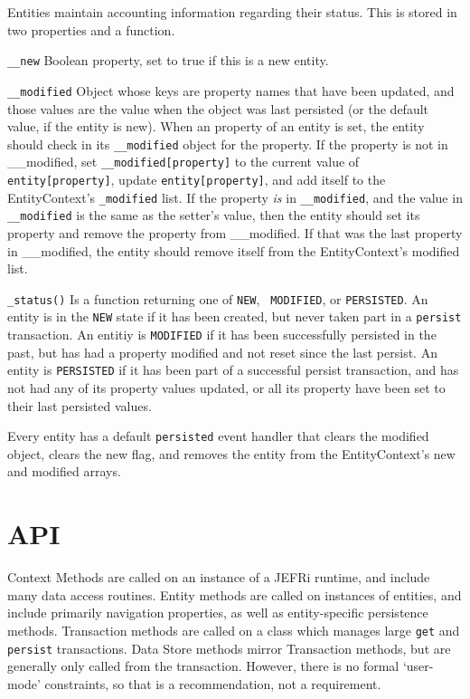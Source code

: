 \documentclass{article}
\newcommand{\ilcode}{\tt}
\begin{document}
Entities maintain accounting information regarding their status. This is stored
in two properties and a function.

{\ilcode \_\_new} Boolean property, set to true if this is a new entity.

{\ilcode \_\_modified} Object whose keys are property names that have been
updated, and those values are the value when the object was last persisted (or
the default value, if the entity is new). When an property of an entity is set,
the entity should check in its {\ilcode \_\_modified} object for the property. If the
property is not in \_\_modified, set {\ilcode \_\_modified[property]} to the current value
of {\ilcode entity[property]}, update {\ilcode entity[property]}, and add itself to the
EntityContext's {\ilcode \_modified} list. If the property {\it  is} in {\ilcode \_\_modified}, and
the value in {\ilcode \_\_modified} is the same as the setter's value, then the entity
should set its property and remove the property from \_\_modified. If that was
the last property in \_\_modified, the entity should remove itself from the
EntityContext's modified list.

{\ilcode \_status()} Is a function returning one of {\ilcode NEW}, {\ilcode
MODIFIED}, or {\ilcode PERSISTED}. An entity is in the {\ilcode NEW} state
if it has been created, but never taken part in a {\ilcode persist} transaction.
An entitiy is {\ilcode MODIFIED} if it has been successfully persisted in the
past, but has had a property modified and not reset since the last persist.
An entity is {\ilcode PERSISTED} if it has been part of a successful persist
transaction, and has not had any of its property values updated, or all its
property have been set to their last persisted values.

Every entity has a default {\ilcode persisted} event handler that clears the
modified object, clears the new flag, and removes the entity from the
EntityContext's new and modified arrays.

\section{API}
Context Methods are called on an instance of a JEFRi runtime, and include many
data access routines. Entity methods are called on instances of entities, and
include primarily navigation properties, as well as entity-specific persistence
methods. Transaction methods are called on a class which manages large {\ilcode get} and
{\ilcode persist} transactions. Data Store methods mirror Transaction methods, but
are generally only called from the transaction. However, there is no formal
`user-mode' constraints, so that is a recommendation, not a requirement.
\end{document}
